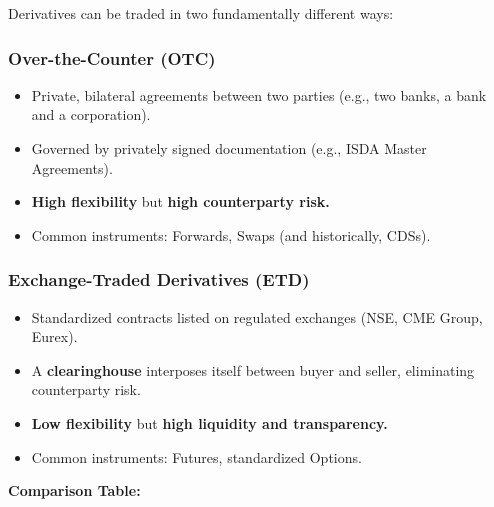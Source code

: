 \documentclass[12pt,openany]{book}
\begin{document}
Derivatives can be traded in two fundamentally different ways:

\subsubsection{Over-the-Counter (OTC)}

\begin{itemize}[leftmargin=*]
    \item Private, bilateral agreements between two parties (e.g., two banks, a bank and a corporation).
    \item Governed by privately signed documentation (e.g., ISDA Master Agreements).
    \item \textbf{High flexibility} but \textbf{high counterparty risk.}
    \item Common instruments: Forwards, Swaps (and historically, CDSs).
\end{itemize}

\subsubsection{Exchange-Traded Derivatives (ETD)}

\begin{itemize}[leftmargin=*]
    \item Standardized contracts listed on regulated exchanges (NSE, CME Group, Eurex).
    \item A \textbf{clearinghouse} interposes itself between buyer and seller, eliminating counterparty risk.
    \item \textbf{Low flexibility} but \textbf{high liquidity and transparency.}
    \item Common instruments: Futures, standardized Options.
\end{itemize}

\textbf{Comparison Table:}
\end{document}
